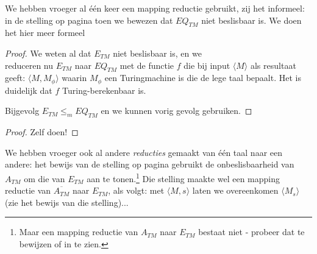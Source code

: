 

We hebben vroeger al \'{e}\'{e}n keer een mapping reductie gebruikt,
zij het informeel: in de stelling op pagina \pageref{reductie1} toen
we bewezen dat $EQ_{TM}$ niet beslisbaar is. We doen het hier meer formeel
\begin{proof}
We weten al dat $E_{TM}$ niet beslisbaar is, en we \\ reduceren nu
$E_{TM}$ naar $EQ_{TM}$ met de functie $f$ die bij input $\langle M \rangle$ als
resultaat geeft: $\langle M,M_\phi \rangle$ waarin $M_\phi$ een Turingmachine is die
de lege taal bepaalt. Het is duidelijk dat $f$ Turing-berekenbaar is.


Bijgevolg $E_{TM} \leq_m EQ_{TM}$ en we kunnen vorig gevolg
gebruiken.  \end{proof}


\begin{proof}
Zelf doen!
\end{proof}


We hebben vroeger ook al andere {\em reducties} gemaakt van
\'{e}\'{e}n taal naar een andere: het bewijs van de stelling op pagina
\pageref{nonreductie1} gebruikt de onbeslisbaarheid van $A_{TM}$ om
die van $E_{TM}$ aan te tonen.\footnote{Maar een mapping reductie van
$A_{TM}$ naar $E_{TM}$ bestaat niet - probeer dat te bewijzen of in te
zien.} Die stelling maakte wel een mapping reductie van
%
$\overline{A_{TM}}$ naar $E_{TM}$, als volgt: met $\langle M,s \rangle$
%
laten we
overeenkomen $\langle M_s \rangle$ (zie het bewijs van die stelling)...


